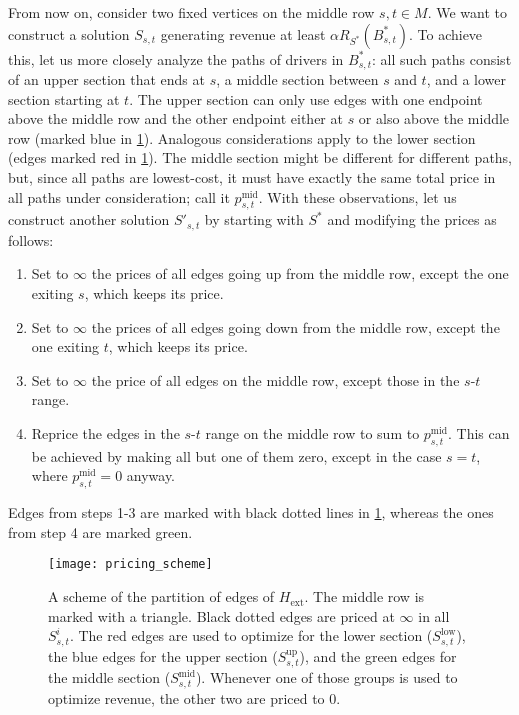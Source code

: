 From now on, consider two fixed vertices on the middle row $s, t \in M$. We want to construct a solution $S_{s, t}$ generating revenue at least $\alpha R_{S^*}(B_{s, t}^*)$. 
%
To achieve this, let us more closely analyze the paths of drivers in $B_{s, t}^*$: all such paths consist of an upper section that ends at $s$, a middle section between $s$ and $t$, and a lower section starting at $t$. The upper section can only use edges with one endpoint above the middle row and the other endpoint either at $s$ or also above the middle row (marked blue in \cref{fig:pricing_scheme}). Analogous considerations apply to the lower section (edges marked red in \cref{fig:pricing_scheme}). The middle section might be different for different paths, but, since all paths are lowest-cost, it must have exactly the same total price in all paths under consideration; call it $p_{s, t}^\mathrm{mid}$. With these observations, let us construct another solution $S'_{s, t}$ by starting with $S^*$ and modifying the prices as follows:
\begin{enumerate}[nosep]
    \item Set to $\infty$ the prices of all edges going up from the middle row, except the one exiting $s$, which keeps its price.
    \item Set to $\infty$ the prices of all edges going down from the middle row, except the one exiting $t$, which keeps its price.
    \item Set to $\infty$ the price of all edges on the middle row, except those in the $s$-$t$ range.
    \item Reprice the edges in the $s$-$t$ range on the middle row to sum to $p_{s, t}^\mathrm{mid}$. This can be achieved by making all but one of them zero, except in the case $s = t$, where $p_{s, t}^\mathrm{mid} = 0$ anyway. 
\end{enumerate}
Edges from steps 1-3 are marked with black dotted lines in \cref{fig:pricing_scheme}, whereas the ones from step 4 are marked green.

\begin{figure}[t]
    \centering
    \texttt{[image: pricing\_scheme]}
    \caption{
        A scheme of the partition of edges of $H_{\mathrm{ext}}$.
        The middle row is marked with a triangle.
        Black dotted edges are priced at $\infty$ in all $S^i_{s, t}$.
        The red edges are used to optimize for the lower section ($S^{\mathrm{low}}_{s,t}$), the blue edges for the upper section ($S^{\mathrm{up}}_{s,t}$), and the green edges for the middle section ($S^{\mathrm{mid}}_{s,t}$).
        Whenever one of those groups is used to optimize revenue, the other two
        are priced to $0$.
    }
    \label{fig:pricing_scheme}
\end{figure}

